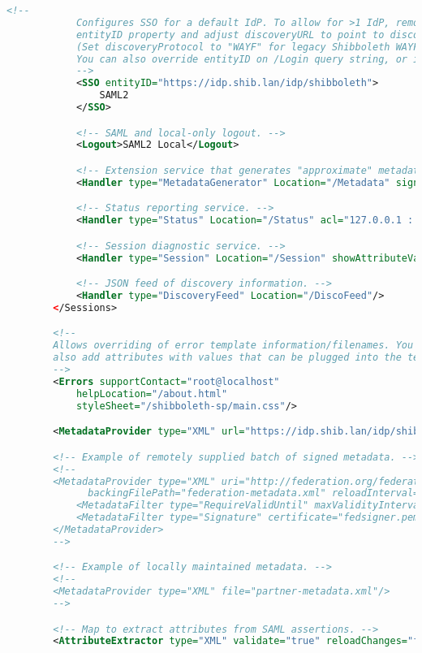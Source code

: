 \begin{lstlisting}[language=xml]
            <!--
            Configures SSO for a default IdP. To allow for >1 IdP, remove
            entityID property and adjust discoveryURL to point to discovery service.
            (Set discoveryProtocol to "WAYF" for legacy Shibboleth WAYF support.)
            You can also override entityID on /Login query string, or in RequestMap/htaccess.
            -->
            <SSO entityID="https://idp.shib.lan/idp/shibboleth">
                SAML2
            </SSO>

            <!-- SAML and local-only logout. -->
            <Logout>SAML2 Local</Logout>

            <!-- Extension service that generates "approximate" metadata based on SP configuration. -->
            <Handler type="MetadataGenerator" Location="/Metadata" signing="false"/>

            <!-- Status reporting service. -->
            <Handler type="Status" Location="/Status" acl="127.0.0.1 ::1"/>

            <!-- Session diagnostic service. -->
            <Handler type="Session" Location="/Session" showAttributeValues="true"/>

            <!-- JSON feed of discovery information. -->
            <Handler type="DiscoveryFeed" Location="/DiscoFeed"/>
        </Sessions>

        <!--
        Allows overriding of error template information/filenames. You can
        also add attributes with values that can be plugged into the templates.
        -->
        <Errors supportContact="root@localhost"
            helpLocation="/about.html"
            styleSheet="/shibboleth-sp/main.css"/>

        <MetadataProvider type="XML" url="https://idp.shib.lan/idp/shibboleth" />

        <!-- Example of remotely supplied batch of signed metadata. -->
        <!--
        <MetadataProvider type="XML" uri="http://federation.org/federation-metadata.xml"
              backingFilePath="federation-metadata.xml" reloadInterval="7200">
            <MetadataFilter type="RequireValidUntil" maxValidityInterval="2419200"/>
            <MetadataFilter type="Signature" certificate="fedsigner.pem"/>
        </MetadataProvider>
        -->

        <!-- Example of locally maintained metadata. -->
        <!--
        <MetadataProvider type="XML" file="partner-metadata.xml"/>
        -->

        <!-- Map to extract attributes from SAML assertions. -->
        <AttributeExtractor type="XML" validate="true" reloadChanges="false" path="attribute-map.xml"/>


\end{lstlisting}
